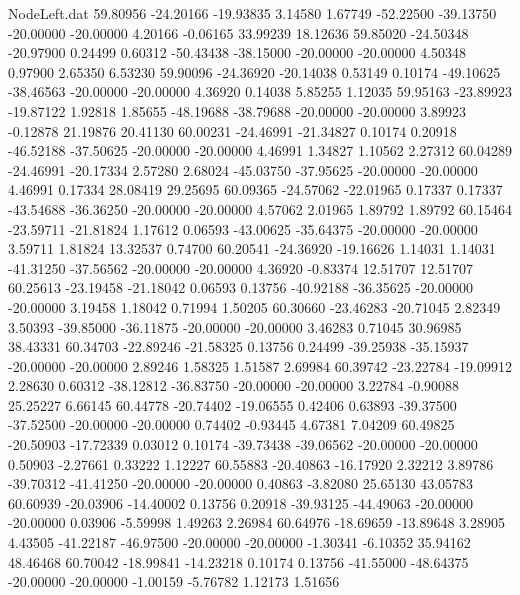 \begin{filecontents}{NodeLeft.dat}
  59.80956  -24.20166  -19.93835     3.14580    1.67749  -52.22500  -39.13750  -20.00000  -20.00000    4.20166   -0.06165   33.99239   18.12636
  59.85020  -24.50348  -20.97900     0.24499    0.60312  -50.43438  -38.15000  -20.00000  -20.00000    4.50348    0.97900    2.65350    6.53230
  59.90096  -24.36920  -20.14038     0.53149    0.10174  -49.10625  -38.46563  -20.00000  -20.00000    4.36920    0.14038    5.85255    1.12035
  59.95163  -23.89923  -19.87122     1.92818    1.85655  -48.19688  -38.79688  -20.00000  -20.00000    3.89923   -0.12878   21.19876   20.41130
  60.00231  -24.46991  -21.34827     0.10174    0.20918  -46.52188  -37.50625  -20.00000  -20.00000    4.46991    1.34827    1.10562    2.27312
  60.04289  -24.46991  -20.17334     2.57280    2.68024  -45.03750  -37.95625  -20.00000  -20.00000    4.46991    0.17334   28.08419   29.25695
  60.09365  -24.57062  -22.01965     0.17337    0.17337  -43.54688  -36.36250  -20.00000  -20.00000    4.57062    2.01965    1.89792    1.89792
  60.15464  -23.59711  -21.81824     1.17612    0.06593  -43.00625  -35.64375  -20.00000  -20.00000    3.59711    1.81824   13.32537    0.74700
  60.20541  -24.36920  -19.16626     1.14031    1.14031  -41.31250  -37.56562  -20.00000  -20.00000    4.36920   -0.83374   12.51707   12.51707
  60.25613  -23.19458  -21.18042     0.06593    0.13756  -40.92188  -36.35625  -20.00000  -20.00000    3.19458    1.18042    0.71994    1.50205
  60.30660  -23.46283  -20.71045     2.82349    3.50393  -39.85000  -36.11875  -20.00000  -20.00000    3.46283    0.71045   30.96985   38.43331
  60.34703  -22.89246  -21.58325     0.13756    0.24499  -39.25938  -35.15937  -20.00000  -20.00000    2.89246    1.58325    1.51587    2.69984
  60.39742  -23.22784  -19.09912     2.28630    0.60312  -38.12812  -36.83750  -20.00000  -20.00000    3.22784   -0.90088   25.25227    6.66145
  60.44778  -20.74402  -19.06555     0.42406    0.63893  -39.37500  -37.52500  -20.00000  -20.00000    0.74402   -0.93445    4.67381    7.04209
  60.49825  -20.50903  -17.72339     0.03012    0.10174  -39.73438  -39.06562  -20.00000  -20.00000    0.50903   -2.27661    0.33222    1.12227
  60.55883  -20.40863  -16.17920     2.32212    3.89786  -39.70312  -41.41250  -20.00000  -20.00000    0.40863   -3.82080   25.65130   43.05783
  60.60939  -20.03906  -14.40002     0.13756    0.20918  -39.93125  -44.49063  -20.00000  -20.00000    0.03906   -5.59998    1.49263    2.26984
  60.64976  -18.69659  -13.89648     3.28905    4.43505  -41.22187  -46.97500  -20.00000  -20.00000   -1.30341   -6.10352   35.94162   48.46468
  60.70042  -18.99841  -14.23218     0.10174    0.13756  -41.55000  -48.64375  -20.00000  -20.00000   -1.00159   -5.76782    1.12173    1.51656

\end{filecontents}
